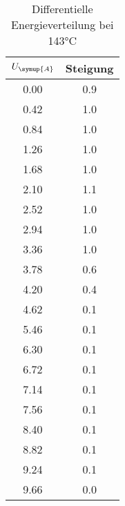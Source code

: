 \begin{table}[!htp]
\centering
\caption{Differentielle Energieverteilung bei 143°C}
\label{tab:messreihe2}
\begin{tabular}{c c}
\toprule
{$U_{\symup{A}}$} & {Steigung} \\
\midrule
0.00 & 0.9 \\
0.42 & 1.0 \\
0.84 & 1.0 \\
1.26 & 1.0 \\
1.68 & 1.0 \\
2.10 & 1.1 \\
2.52 & 1.0 \\
2.94 & 1.0 \\
3.36 & 1.0 \\
3.78 & 0.6 \\
4.20 & 0.4 \\
4.62 & 0.1 \\
5.46 & 0.1 \\
6.30 & 0.1 \\
6.72 & 0.1 \\
7.14 & 0.1 \\
7.56 & 0.1 \\
8.40 & 0.1 \\
8.82 & 0.1 \\
9.24 & 0.1 \\
9.66 & 0.0 \\
\bottomrule
\end{tabular}
\end{table}